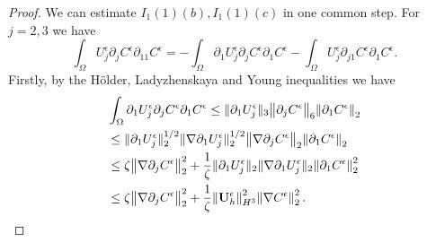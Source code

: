 \documentclass[11pt, a4paper]{article}
\begin{document}
\begin{proof}
We can estimate $I_1(1)(b), I_1(1)(c)$ in one common step. For $j = 2,3$ we have
$$ \int_\Omega U_j^\epsilon \partial_j C^\epsilon \partial_{11} C^\epsilon = - \int_\Omega \partial_1 U_j^\epsilon \partial_j C^\epsilon \partial_1 C^\epsilon - \int_\Omega U_j^\epsilon \partial_{j1} C^\epsilon \partial_1 C^\epsilon.$$
Firstly, by the H\"older, Ladyzhenskaya and Young inequalities we have
\begin{equation}
\begin{split}
& \int_\Omega \partial_1 U_j^\epsilon \partial_j C^\epsilon \partial_1 C^\epsilon \leq \| \partial_1 U_j^\epsilon \| _3 \norm{\partial_j C^\epsilon}_6 \norm{\partial_1 C^\epsilon}_2 \\
& \leq \| \partial_1 U_j^\epsilon \|_2^{1/2} \|\nabla \partial_1 U_j^\epsilon \|_2^{1/2} \norm{\nabla \partial_j C^\epsilon}_2 \norm{\partial_1 C^\epsilon}_2 \\
& \leq \zeta \norm{\nabla \partial_j C^\epsilon}_2^2 + \frac{1}{\zeta} \| \partial_1 U_j^\epsilon \|_2 \|\nabla \partial_1 U_j^\epsilon \|_2 \norm{\partial_1 C^\epsilon}_2^2 \\
& \leq \zeta \norm{\nabla \partial_j C^\epsilon}_2^2 + \frac{1}{\zeta} \norm{\mathbf{U}_h^\epsilon}_{H^3}^2 \norm{\nabla C^\epsilon}_2^2.
\end{split}
\end{equation}


\end{proof}
\end{document}
